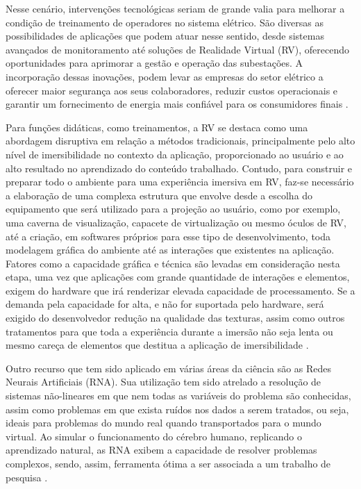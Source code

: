 Nesse cenário, intervenções tecnológicas seriam de grande valia para melhorar a condição de treinamento de operadores no sistema elétrico. São diversas as possibilidades de aplicações que podem atuar nesse sentido, desde sistemas avançados de monitoramento até soluções de Realidade Virtual (RV), oferecendo oportunidades para aprimorar a gestão e operação das subestações. A incorporação dessas inovações, podem levar as empresas do setor elétrico a oferecer maior segurança aos seus colaboradores, reduzir custos operacionais e garantir um fornecimento de energia mais confiável para os consumidores finais  \cite{zhou2016big}.

Para funções didáticas, como treinamentos, a RV se destaca como uma abordagem disruptiva em relação a métodos tradicionais, principalmente pelo alto nível de imersibilidade no contexto da aplicação, proporcionado ao usuário e ao alto resultado no aprendizado do conteúdo trabalhado. Contudo, para construir e preparar todo o ambiente para uma experiência imersiva em RV, faz-se necessário a elaboração de uma complexa estrutura que envolve desde a escolha do equipamento que será utilizado para a projeção ao usuário, como por exemplo, uma caverna de visualização, capacete de virtualização ou mesmo óculos de RV, até a criação, em softwares próprios para esse tipo de desenvolvimento, toda modelagem gráfica do ambiente até as interações que existentes na aplicação. Fatores como a capacidade gráfica e técnica são levadas em consideração nesta etapa, uma vez que aplicações com grande quantidade de interações e elementos, exigem do hardware que irá renderizar elevada capacidade de processamento. Se a demanda pela capacidade for alta, e não for suportada pelo hardware, será exigido do desenvolvedor redução na qualidade das texturas, assim como outros tratamentos para que toda a experiência durante a imersão não seja lenta ou mesmo careça de elementos que destitua a aplicação de imersibilidade \cite {palmeira2020uncanny}. 

Outro recurso que tem sido aplicado em várias áreas da ciência são as Redes Neurais Artificiais (RNA). Sua utilização tem sido atrelado a resolução de sistemas não-lineares em que nem todas as variáveis do problema são conhecidas, assim como problemas em que exista ruídos nos dados a serem tratados, ou seja, ideais para problemas do mundo real quando transportados para o mundo virtual. Ao simular o funcionamento do cérebro humano, replicando o aprendizado natural, as RNA exibem a capacidade de resolver problemas complexos, sendo, assim, ferramenta ótima a ser associada a um trabalho de pesquisa  \cite {ougcu2012forecasting}.

